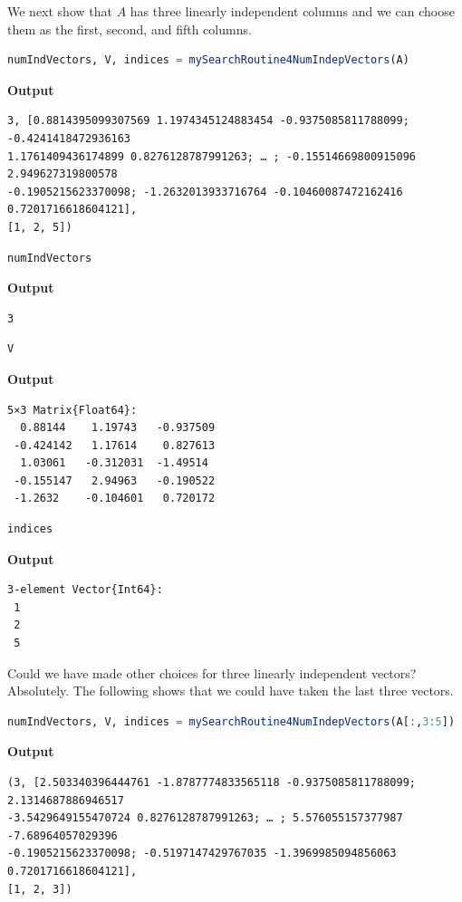 We next show that $A$ has three linearly independent columns and we can choose them as the first, second, and fifth columns. \\

\begin{lstlisting}[language=Julia,style=mystyle]
numIndVectors, V, indices = mySearchRoutine4NumIndepVectors(A)
\end{lstlisting}
\textbf{Output} 
\begin{verbatim}
3, [0.8814395099307569 1.1974345124883454 -0.9375085811788099; -0.4241418472936163
1.1761409436174899 0.8276128787991263; … ; -0.15514669800915096 2.949627319800578
-0.1905215623370098; -1.2632013933716764 -0.10460087472162416 0.7201716618604121], 
[1, 2, 5])
\end{verbatim}

\begin{lstlisting}[language=Julia,style=mystyle]
numIndVectors
\end{lstlisting}
\textbf{Output} 
\begin{verbatim}
3
\end{verbatim}

\begin{lstlisting}[language=Julia,style=mystyle]
V
\end{lstlisting}
\textbf{Output} 
\begin{verbatim}
5×3 Matrix{Float64}:
  0.88144    1.19743   -0.937509
 -0.424142   1.17614    0.827613
  1.03061   -0.312031  -1.49514
 -0.155147   2.94963   -0.190522
 -1.2632    -0.104601   0.720172
\end{verbatim}

\begin{lstlisting}[language=Julia,style=mystyle]
indices
\end{lstlisting}
\textbf{Output} 
\begin{verbatim}
3-element Vector{Int64}:
 1
 2
 5
\end{verbatim}

Could we have made other choices for three linearly independent vectors? Absolutely. The following shows that we could have taken the last three vectors. 
\begin{lstlisting}[language=Julia,style=mystyle]
 numIndVectors, V, indices = mySearchRoutine4NumIndepVectors(A[:,3:5])
\end{lstlisting}
\textbf{Output} 
\begin{verbatim}
(3, [2.503340396444761 -1.8787774833565118 -0.9375085811788099; 2.1314687886946517
-3.5429649155470724 0.8276128787991263; … ; 5.576055157377987 -7.68964057029396
-0.1905215623370098; -0.5197147429767035 -1.3969985094856063 0.7201716618604121], 
[1, 2, 3])
\end{verbatim}


